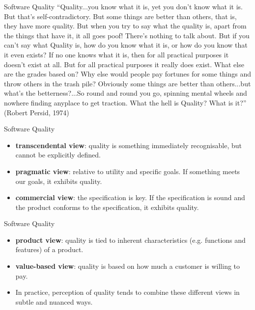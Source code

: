 \begin{frame}{Software Quality}
    {\small
	``Quality...you know what it is, yet you don't know what it is. But that's self-contradictory. But some things are better than 
	others, that is, they have more quality. But when you try to say what the quality is, apart from the things that have it, it all 
	goes poof! There's nothing to talk about. But if you can't say what Quality is, how do you know what it is, or how do you know 
	that it even exists? If no one knows what it is, then for all practical purposes it doesn't exist at all. But for all practical purposes 
	it really does exist. What else are the grades based on? Why else would people pay fortunes for some things and throw others
	 in the trash pile? Obviously some things are better than others...but what's the betterness?...So round and round you go, 
	 spinning mental wheels and nowhere finding anyplace to get traction. What the hell is Quality? What is it?''}
	\vspace{2ex}
	(Robert Persid, 1974)
\end{frame}

\begin{frame}{Software Quality}
	\begin{itemize}
		\item \textbf{transcendental view}: quality is something immediately recognisable, but cannot be explicitly defined. \pause
		\item \textbf{pragmatic view}: relative to utility and specific goals. If something meets our goals, it exhibits quality.  \pause
		\item \textbf{commercial view}: the specification is key. If the specification is sound and the product conforms to the
		specification, it exhibits quality. 
	\end{itemize}
\end{frame}

\begin{frame}{Software Quality}
	\begin{itemize}
		\item \textbf{product view}: quality is tied to inherent characteristics (e.g. functions and features) of a product.  \pause
		\item \textbf{value-based view}: quality is based on how much a customer is willing to pay.  \pause
		\item In practice, perception of quality tends to combine these different views in subtle and nuanced ways.
	\end{itemize}
\end{frame}

